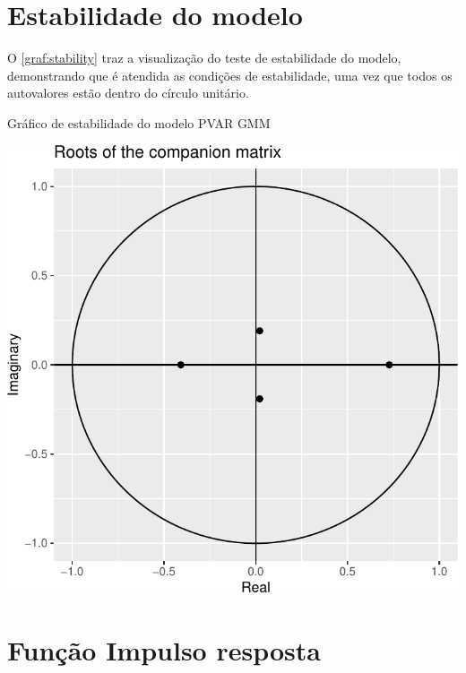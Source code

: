 \documentclass[
  12pt,
  12pt,
  openright,
  oneside,
  a4paper,
  chapter=TITLE,
  section=TITLE,
  subsection=TITLE,
  subsubsection=TITLE,
  english,
  portugues,
  sumario=tradicional]{abntex2}
\begin{document}
\section{Estabilidade do modelo}

O \autoref{graf:stability} traz a visualização do teste de estabilidade do modelo, demonstrando que é atendida as condições de estabilidade, uma vez que todos os autovalores estão dentro do círculo unitário.

\begin{grafico}[!hbtp]
\vspace{20pt}
\caption{Gráfico de estabilidade do modelo PVAR GMM}
\vspace{-4mm}

\begin{center}\includegraphics{12-exportedfigures/stability.plot-1} \end{center}
\vspace{-3mm}
\label{graf:stability}
\vspace{-2mm}
\end{grafico}

\vspace{20pt}

\section{Função Impulso resposta}
\end{document}
